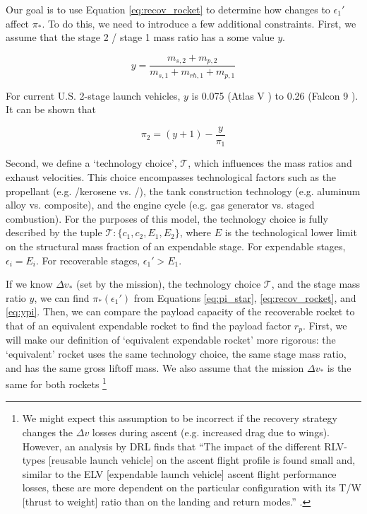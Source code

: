 \documentclass[conf]{new-aiaa}
\begin{document}
Our goal is to use Equation \ref{eq:recov_rocket} to determine how changes to $\epsilon_1'$ affect $\pi_*$. To do this, we need to introduce a few additional constraints. First, we assume that the stage 2 / stage 1 mass ratio has a some value $y$.

\begin{equation}
y = \frac{m_{s,2} + m_{p,2}}{m_{s,1} + m_{rh,1} + m_{p,1}}
\end{equation}

For current U.S. 2-stage launch vehicles, $y$ is 0.075 (Atlas V \cite{wade:atlas}) to 0.26 (Falcon 9 \cite{wiki:Falcon9FullThrust}). It can be shown that

\begin{equation}
\label{eq:ypi}
\pi_2 = (y + 1) - \frac{y}{\pi_1}
\end{equation}

Second, we define a `technology choice', $\mathcal{T}$, which influences the mass ratios and exhaust velocities. This choice encompasses technological factors such as the propellant (e.g. /kerosene vs. /), the tank construction technology (e.g. aluminum alloy vs. composite), and the engine cycle (e.g. gas generator vs. staged combustion). For the purposes of this model, the technology choice is fully described by the tuple $\mathcal{T} : \{ c_1, c_2, E_1, E_2 \}$, where $E$ is the technological lower limit on the structural mass fraction of an expendable stage. For expendable stages, $\epsilon_i = E_i$. For recoverable stages, $\epsilon_1' > E_1$.

If we know $\Delta v_*$ (set by the mission), the technology choice $\mathcal{T}$, and the stage mass ratio $y$, we can find $\pi_*(\epsilon_1')$ from Equations \ref{eq:pi_star}, \ref{eq:recov_rocket}, and \ref{eq:ypi}. Then, we can compare the payload capacity of the recoverable rocket to that of an equivalent expendable rocket to find the payload factor $r_p$. First, we will make our definition of `equivalent expendable rocket' more rigorous: the `equivalent' rocket uses the same technology choice, the same stage mass ratio, and has the same gross liftoff mass. We also assume that the mission $\Delta v_*$ is the same for both rockets \footnote{We might expect this assumption to be incorrect if the recovery strategy changes the $\Delta v$ losses during ascent (e.g. increased drag due to wings). However, an analysis by DRL finds that ``The impact of the different RLV-types [reusable launch vehicle] on the ascent flight profile is found small and, similar to the ELV [expendable launch vehicle] ascent flight performance losses, these are more dependent on the particular configuration with its T/W [thrust to weight] ratio than on the landing and return modes.'' \cite{Stappert2017}.}
\end{document}
